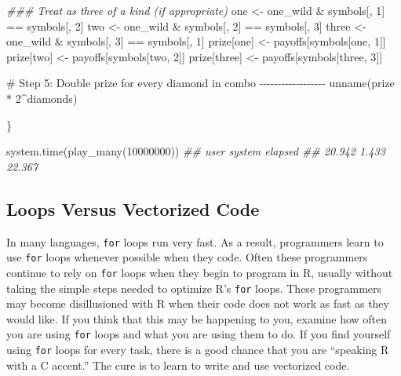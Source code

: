 \documentclass[
  letterpaper,
  DIV=11,
  numbers=noendperiod]{scrbook}
\newenvironment{Shaded}{\begin{snugshade}}{\end{snugshade}}
\newcommand{\CommentTok}[1]{\textcolor[rgb]{0.37,0.37,0.37}{#1}}
\newcommand{\DecValTok}[1]{\textcolor[rgb]{0.68,0.00,0.00}{#1}}
\newcommand{\DocumentationTok}[1]{\textcolor[rgb]{0.37,0.37,0.37}{\textit{#1}}}
\newcommand{\FunctionTok}[1]{\textcolor[rgb]{0.28,0.35,0.67}{#1}}
\newcommand{\NormalTok}[1]{\textcolor[rgb]{0.00,0.23,0.31}{#1}}
\newcommand{\OtherTok}[1]{\textcolor[rgb]{0.00,0.23,0.31}{#1}}
\newcommand{\SpecialCharTok}[1]{\textcolor[rgb]{0.37,0.37,0.37}{#1}}
\begin{document}
\begin{Shaded}
\begin{Highlighting}[]
  \DocumentationTok{\#\#\# Treat as three of a kind (if appropriate)}
\NormalTok{  one }\OtherTok{\textless{}{-}}\NormalTok{ one\_wild }\SpecialCharTok{\&}\NormalTok{ symbols[, }\DecValTok{1}\NormalTok{] }\SpecialCharTok{==}\NormalTok{ symbols[, }\DecValTok{2}\NormalTok{]}
\NormalTok{  two }\OtherTok{\textless{}{-}}\NormalTok{ one\_wild }\SpecialCharTok{\&}\NormalTok{ symbols[, }\DecValTok{2}\NormalTok{] }\SpecialCharTok{==}\NormalTok{ symbols[, }\DecValTok{3}\NormalTok{]}
\NormalTok{  three }\OtherTok{\textless{}{-}}\NormalTok{ one\_wild }\SpecialCharTok{\&}\NormalTok{ symbols[, }\DecValTok{3}\NormalTok{] }\SpecialCharTok{==}\NormalTok{ symbols[, }\DecValTok{1}\NormalTok{]}
\NormalTok{  prize[one] }\OtherTok{\textless{}{-}}\NormalTok{ payoffs[symbols[one, }\DecValTok{1}\NormalTok{]]}
\NormalTok{  prize[two] }\OtherTok{\textless{}{-}}\NormalTok{ payoffs[symbols[two, }\DecValTok{2}\NormalTok{]]}
\NormalTok{  prize[three] }\OtherTok{\textless{}{-}}\NormalTok{ payoffs[symbols[three, }\DecValTok{3}\NormalTok{]]}
 
  \CommentTok{\# Step 5: Double prize for every diamond in combo {-}{-}{-}{-}{-}{-}{-}{-}{-}{-}{-}{-}{-}{-}{-}{-}{-}{-}}
  \FunctionTok{unname}\NormalTok{(prize }\SpecialCharTok{*} \DecValTok{2}\SpecialCharTok{\^{}}\NormalTok{diamonds)}
  
\NormalTok{\}}

\FunctionTok{system.time}\NormalTok{(}\FunctionTok{play\_many}\NormalTok{(}\DecValTok{10000000}\NormalTok{))}
\DocumentationTok{\#\#   user  system elapsed }
\DocumentationTok{\#\# 20.942   1.433  22.367}
\end{Highlighting}
\end{Shaded}

\subsection{Loops Versus Vectorized
Code}\label{loops-versus-vectorized-code}

In many languages, \texttt{for} loops run very fast. As a result,
programmers learn to use \texttt{for} loops whenever possible when they
code. Often these programmers continue to rely on \texttt{for} loops
when they begin to program in R, usually without taking the simple steps
needed to optimize R's \texttt{for} loops. These programmers may become
disillusioned with R when their code does not work as fast as they would
like. If you think that this may be happening to you, examine how often
you are using \texttt{for} loops and what you are using them to do. If
you find yourself using \texttt{for} loops for every task, there is a
good chance that you are ``speaking R with a C accent.'' The cure is to
learn to write and use vectorized code.
\end{document}

